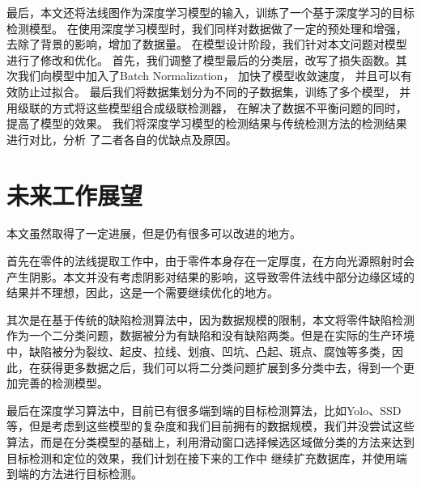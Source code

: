 最后，本文还将法线图作为深度学习模型的输入，训练了一个基于深度学习的目标检测模型。
在使用深度学习模型时，我们同样对数据做了一定的预处理和增强，去除了背景的影响，增加了数据量。
在模型设计阶段，我们针对本文问题对模型进行了修改和优化。
首先，我们调整了模型最后的分类层，改写了损失函数。其次我们向模型中加入了Batch Normalization，
加快了模型收敛速度，
并且可以有效防止过拟合。
最后我们将数据集划分为不同的子数据集，训练了多个模型，
并用级联的方式将这些模型组合成级联检测器，
在解决了数据不平衡问题的同时，提高了模型的效果。
我们将深度学习模型的检测结果与传统检测方法的检测结果进行对比，分析
了二者各自的优缺点及原因。


\section{未来工作展望}

本文虽然取得了一定进展，但是仍有很多可以改进的地方。

首先在零件的法线提取工作中，由于零件本身存在一定厚度，在方向光源照射时会产生阴影。本文并没有考虑阴影对结果的影响，这导致零件法线中部分边缘区域的结果并不理想，因此，这是一个需要继续优化的地方。

其次是在基于传统的缺陷检测算法中，因为数据规模的限制，本文将零件缺陷检测作为一个二分类问题，数据被分为有缺陷和没有缺陷两类。但是在实际的生产环境中，缺陷被分为裂纹、起皮、拉线、划痕、凹坑、凸起、斑点、腐蚀等多类，因此，在获得更多数据之后，我们可以将二分类问题扩展到多分类中去，得到一个更加完善的检测模型。

最后在深度学习算法中，目前已有很多端到端的目标检测算法，比如Yolo、SSD等，但是考虑到这些模型的复杂度和我们目前拥有的数据规模，我们并没尝试这些算法，而是在分类模型的基础上，利用滑动窗口选择候选区域做分类的方法来达到目标检测和定位的效果，我们计划在接下来的工作中
继续扩充数据库，并使用端到端的方法进行目标检测。